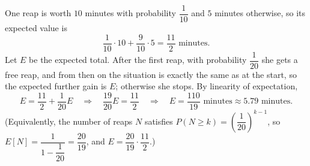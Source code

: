 One reap is worth $10$ minutes with probability $\dfrac1{10}$ and $5$ minutes otherwise, so its expected value is
\[\dfrac{1}{10}\cdot10+\dfrac{9}{10}\cdot5=\dfrac{11}{2}\text{ minutes}.\]
Let $E$ be the expected total. After the first reap, with probability $\dfrac1{20}$ she gets a free reap, and from then on the situation is exactly the same as at the start, so the expected further gain is $E$; otherwise she stops. By linearity of expectation,
\[E=\dfrac{11}{2}+\dfrac{1}{20}E\quad\Longrightarrow\quad\dfrac{19}{20}E=\dfrac{11}{2}\quad\Longrightarrow\quad E=\boxed{\dfrac{110}{19}\text{ minutes}}\approx5.79\text{ minutes}.\]
(Equivalently, the number of reaps $N$ satisfies $P(N\ge k)=\left(\dfrac1{20}\right)^{k-1}$, so $E[N]=\dfrac{1}{1-\dfrac1{20}}=\dfrac{20}{19}$, and $E=\dfrac{20}{19}\cdot\dfrac{11}{2}$.)
